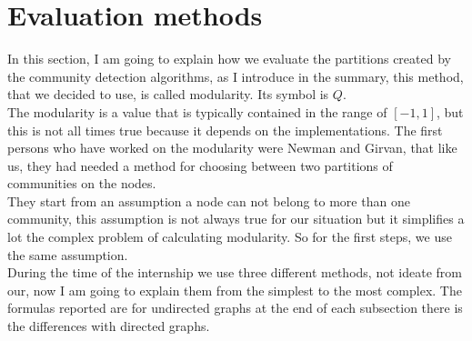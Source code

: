 \documentclass[epsfig,a4paper,11pt,titlepage,twoside,openany]{book}
\begin{document}

\newcommand{\mmax}[0]{mod\_withMax}
\newcommand{\mover}[0]{mod\_overlap }
\newcommand{\mmod}[0]{modified modularity}
\fi					%

%
\chapter{Evaluation methods}
In this section, I am going to explain how we evaluate the partitions created by the community detection algorithms, as I introduce in the summary, this method, that we decided to use, is called modularity. Its symbol is $Q$.\\
The modularity is a value that is typically contained in the range of $[-1, 1]$, but this is not all times true because it depends on the implementations. The first persons who have worked on the modularity were Newman and Girvan, that like us, they had needed a method for choosing between two partitions of communities on the nodes.\\
They start from an assumption a node can not belong to more than one community, this assumption is not always true for our situation but it simplifies a lot the complex problem of calculating modularity. So for the first steps, we use the same assumption.\\
During the time of the internship we use three different methods, not ideate from our, now I am going to explain them from the simplest to the most complex. The formulas reported are for undirected graphs at the end of each subsection there is the differences with directed graphs.
%
%
\end{document}
